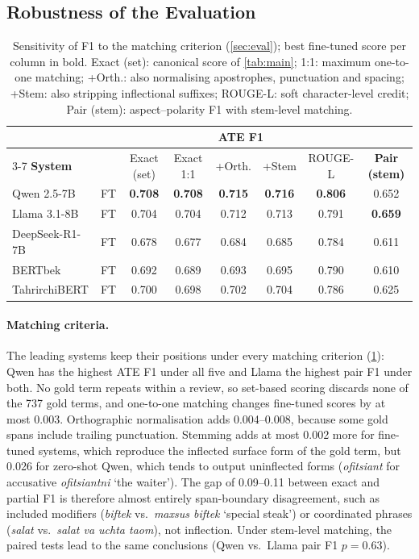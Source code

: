 \documentclass[runningheads]{llncs}
\begin{document}
\subsection{Robustness of the Evaluation}
\label{sec:res_robust}

\begin{table}[t]
\centering
\caption{Sensitivity of F1 to the matching criterion (\cref{sec:eval}); best fine-tuned score per column in bold. Exact (set): canonical score of \cref{tab:main}; 1:1: maximum one-to-one matching; +Orth.: also normalising apostrophes, punctuation and spacing; +Stem: also stripping inflectional suffixes; ROUGE-L: soft character-level credit; Pair (stem): aspect--polarity F1 with stem-level matching.}
\label{tab:robust}
\setlength{\tabcolsep}{4.5pt}
\footnotesize
\begin{tabular}{@{}llcccccc@{}}
\toprule
& & \multicolumn{5}{c}{\textbf{ATE F1}} & \\
\cmidrule(lr){3-7}
\textbf{System} & & Exact (set) & Exact 1:1 & +Orth. & +Stem & ROUGE-L & \textbf{Pair (stem)} \\
\midrule
Qwen 2.5-7B    & FT & \textbf{0.708} & \textbf{0.708} & \textbf{0.715} & \textbf{0.716} & \textbf{0.806} & 0.652 \\
Llama 3.1-8B   & FT & 0.704 & 0.704 & 0.712 & 0.713 & 0.791 & \textbf{0.659} \\
DeepSeek-R1-7B & FT & 0.678 & 0.677 & 0.684 & 0.685 & 0.784 & 0.611 \\
BERTbek        & FT & 0.692 & 0.689 & 0.693 & 0.695 & 0.790 & 0.610 \\
TahrirchiBERT  & FT & 0.700 & 0.698 & 0.702 & 0.704 & 0.786 & 0.625 \\
\bottomrule
\end{tabular}
\end{table}

\paragraph{Matching criteria.} The leading systems keep their positions under every matching criterion (\cref{tab:robust}): Qwen has the highest ATE F1 under all five and Llama the highest pair F1 under both. No gold term repeats within a review, so set-based scoring discards none of the 737 gold terms, and one-to-one matching changes fine-tuned scores by at most 0.003. Orthographic normalisation adds 0.004--0.008, because some gold spans include trailing punctuation. Stemming adds at most 0.002 more for fine-tuned systems, which reproduce the inflected surface form of the gold term, but 0.026 for zero-shot Qwen, which tends to output uninflected forms (\textit{ofitsiant} for accusative \textit{ofitsiantni} `the waiter'). The gap of 0.09--0.11 between exact and partial F1 is therefore almost entirely span-boundary disagreement, such as included modifiers (\textit{biftek} vs.\ \textit{maxsus biftek} `special steak') or coordinated phrases (\textit{salat} vs.\ \textit{salat va uchta taom}), not inflection. Under stem-level matching, the paired tests lead to the same conclusions (Qwen vs.\ Llama pair F1 $p{=}0.63$).
\end{document}

